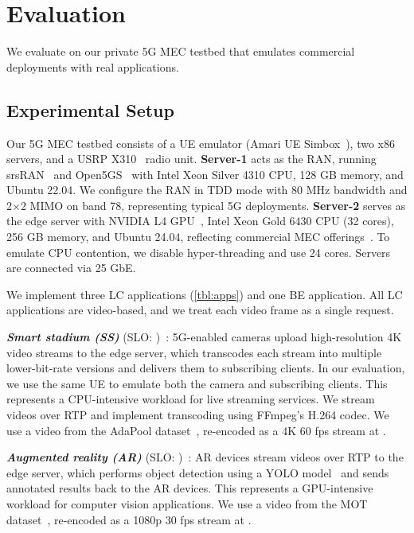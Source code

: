 \section{Evaluation}
\label{sec:eval}

We evaluate \sys{} on our private 5G MEC testbed that emulates commercial deployments with real applications. 

\subsection{Experimental Setup}
\label{sec:eval-setup}

Our 5G MEC testbed consists of a UE emulator (Amari UE Simbox~\cite{amari-uesim}), two x86 servers, and a USRP X310~\cite{usrp-x310} radio unit.
\textbf{Server-1} acts as the RAN, running srsRAN~\cite{srsran} and Open5GS~\cite{open5gc} with Intel Xeon Silver 4310 CPU, 128 GB memory, and Ubuntu 22.04.
We configure the RAN in TDD mode with 80 MHz bandwidth and 2$\times$2 MIMO on band 78, representing typical 5G deployments.
\textbf{Server-2} serves as the edge server with NVIDIA L4 GPU~\cite{nvidia-l4}, Intel Xeon Gold 6430 CPU (32 cores), 256 GB memory, and Ubuntu 24.04, reflecting commercial MEC offerings~\cite{www-outpost}.
To emulate CPU contention, we disable hyper-threading and use 24 cores.
Servers are connected via 25 GbE.


We implement three LC applications (\autoref{tbl:apps}) and one BE application. 
All LC applications are video-based, and we treat each video frame as a single request.

\noindent\textit{\textbf{Smart stadium (SS)}} (SLO: )~\cite{www-orange-5gstadium,www-red5perfect5G-in-venue}: 5G-enabled cameras upload high-resolution 4K video streams to the edge server, which transcodes each stream into multiple lower-bit-rate versions and delivers them to subscribing clients.
In our evaluation, we use the same UE to emulate both the camera and subscribing clients.
This represents a CPU-intensive workload for live streaming services.
We stream videos over RTP and implement transcoding using FFmpeg's H.264 codec.
We use a video from the AdaPool dataset~\cite{stergiou2021adapool}, re-encoded as a 4K 60 fps stream at .

\noindent\textit{\textbf{Augmented reality (AR)}} (SLO: )~\cite{mao2019delay,padmanabhan2023gemel}: AR devices stream videos over RTP to the edge server, which performs object detection using a YOLO model~\cite{yolo:cvpr16} and sends annotated results back to the AR devices.
This represents a GPU-intensive workload for computer vision applications.
We use a video from the MOT dataset~\cite{leal2015motchallenge}, re-encoded as a 1080p 30 fps stream at .

